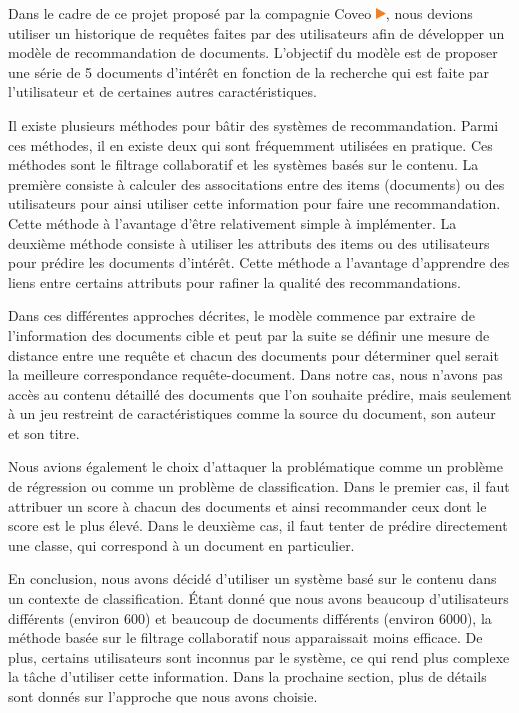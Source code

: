 Dans le cadre de ce projet proposé par la compagnie Coveo \href{https://www.coveo.com/fr}{\includegraphics[height=0.3cm]{coveo_logo}}, nous devions utiliser un historique de requêtes faites par des utilisateurs afin de développer un modèle de recommandation de documents. 
L'objectif du modèle est de proposer une série de 5 documents d'intérêt en fonction de la recherche qui est faite par l'utilisateur et de certaines autres caractéristiques.

Il existe plusieurs méthodes pour bâtir des systèmes de recommandation. Parmi ces méthodes, il en existe deux qui sont fréquemment utilisées en pratique. Ces méthodes sont le filtrage collaboratif et les systèmes basés sur le contenu. La première consiste à calculer des associtations entre des items (documents) ou des utilisateurs pour ainsi utiliser cette information pour faire une recommandation. Cette méthode à l'avantage d'être relativement simple à implémenter. La deuxième méthode consiste à utiliser les attributs des items ou des utilisateurs pour prédire les documents d'intérêt. Cette méthode a l'avantage d'apprendre des liens entre certains attributs pour rafiner la qualité des recommandations.

Dans ces différentes approches décrites, le modèle commence par extraire de l'information des documents cible et peut par la suite se définir une mesure de distance entre une requête et chacun des documents pour déterminer quel serait la meilleure correspondance requête-document. Dans notre cas, nous n'avons pas accès au contenu détaillé des documents que l'on souhaite prédire, mais seulement à un jeu restreint de caractéristiques comme la source du document, son auteur et son titre.

Nous avions également le choix d'attaquer la problématique comme un problème de régression ou comme un problème de classification. Dans le premier cas, il faut attribuer un score à chacun des documents et ainsi recommander ceux dont le score est le plus élevé. Dans le deuxième cas, il faut tenter de prédire directement une classe, qui correspond à un document en particulier. 

En conclusion, nous avons décidé d'utiliser un système basé sur le contenu dans un contexte de classification. Étant donné que nous avons beaucoup d'utilisateurs différents (environ 600) et beaucoup de documents différents (environ 6000), la méthode basée sur le filtrage collaboratif nous apparaissait moins efficace. De plus, certains utilisateurs sont inconnus par le système, ce qui rend plus complexe la tâche d'utiliser cette information. Dans la prochaine section, plus de détails sont donnés sur l'approche que nous avons choisie.